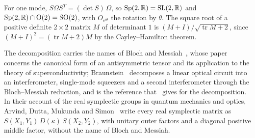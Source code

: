 \begin{vetdenv}
For one mode, $S\Omega S^T=(\det S)\,\Omega$, so $\mathrm{Sp}(2,\mathbb R)=\mathrm{SL}(2,\mathbb R)$ and
$\mathrm{Sp}(2,\mathbb R)\cap\mathrm O(2)=\mathrm{SO}(2)$, with $O_{e^{i\theta}}$ the rotation by $\theta$. The square root of
a positive definite $2\times2$ matrix $M$ of determinant $1$ is $(M+I)/\sqrt{\operatorname{tr}M+2}$, since
$(M+I)^2=(\operatorname{tr}M+2)M$ by the Cayley--Hamilton theorem.

The decomposition carries the names of Bloch and Messiah~\cite{bm}, whose paper concerns the canonical form of an
antisymmetric tensor and its application to the theory of superconductivity;  Braunstein~\cite{braunstein} decomposes a linear optical circuit into an interferometer, single-mode squeezers
and a second interferometer through the Bloch--Messiah reduction, and is the reference that~\cite{tjoacirac} gives for
the decomposition. In their account of the real symplectic groups in quantum mechanics and optics, Arvind, Dutta, Mukunda and
Simon~\cite[Sec.~IV]{adms} write every real symplectic matrix as $S(X_1,Y_1)\,D(\kappa)\,S(X_2,Y_2)$, with unitary outer
factors and a diagonal positive middle factor, without the name of Bloch and Messiah. 
\end{vetdenv}
